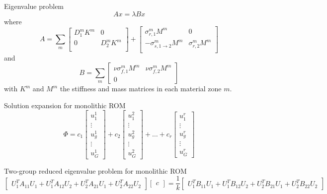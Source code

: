 \documentclass[12pt]{article}
\begin{document}
Eigenvalue problem
\[
A x = \lambda Bx
\]
where
\[
A = \sum_m 
\begin{bmatrix}
D_1^m K^m & 0\\
0 & D_2^m K^m \\
\end{bmatrix}
+
\begin{bmatrix}
\sigma_{r,1}^m M^m & 0\\
-\sigma_{s,1\to2}^m M^m & \sigma_{r,2}^m M^m \\
\end{bmatrix}
\]
and
\[
B = \sum_m 
\begin{bmatrix}
\nu\sigma_{f,1}^m M^m & \nu\sigma_{f,2}^m M^m \\
0 & 
\end{bmatrix}
\]
with $K^m$ and $M^m$ the stiffness and mass matrices in each material zone $m$.

\bigskip

Solution expansion for monolithic ROM
\[
\Phi = 
c_1 
\begin{bmatrix}
u^1_1 \\
\vdots \\
u^1_g \\
\vdots \\
u^1_G 
\end{bmatrix}
+ 
c_2 
\begin{bmatrix}
u^2_1 \\
\vdots \\
u^2_g \\
\vdots \\
u^2_G 
\end{bmatrix}
+ 
\ldots
+
c_r 
\begin{bmatrix}
u^r_1 \\
\vdots \\
u^r_g \\
\vdots \\
u^r_G 
\end{bmatrix}
\]

Two-group reduced eigenvalue problem for monolithic ROM
\[
\begin{bmatrix}
U^T_1 A_{11} U_1 +  U^T_1 A_{12} U_2 +
U^T_2 A_{21} U_1 +  U^T_2 A_{22} U_2 
\end{bmatrix}
\begin{bmatrix}
c
\end{bmatrix}
=
\frac{1}{k}
\begin{bmatrix}
U^T_1 B_{11} U_1 +  U^T_1 B_{12} U_2 +
U^T_2 B_{21} U_1 +  U^T_2 B_{22} U_2 
\end{bmatrix}
\]
\end{document}
